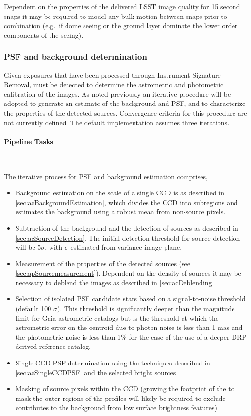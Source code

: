 Dependent on the properties of the delivered LSST image quality for 15 second snaps it may be required to model any bulk motion between snaps prior to combination (e.g.\ if dome seeing or the ground layer dominate the lower order components of the seeing).

\subsubsection{PSF and background determination}
\label{sec:apPSFBackground}

Given exposures that have been processed through Instrument Signature Removal, \Sources must be detected to determine the astrometric and photometric calibration of the images. As noted previously an iterative procedure will be adopted to generate an estimate of the background and PSF, and to characterize the properties of the detected sources.  Convergence criteria for this procedure are not currently defined. The default implementation assumes three iterations.

\paragraph{Pipeline Tasks}~

The iterative process for PSF and background estimation comprises,
\begin{itemize}
\item Background estimation on the scale of a single CCD is as described in \ref{sec:acBackgroundEstimation}, which divides the CCD into subregions and estimates the background using a robust mean from non-source pixels.
\item Subtraction of the background and the detection of sources as described in \ref{sec:acSourceDetection}. The initial detection threshold for source detection will be 5$\sigma$, with $\sigma$ estimated from variance image plane.
\item Measurement of the properties of the detected sources (see \ref{sec:apSourcemeasurement}). Dependent on the density of sources it may be necessary to deblend the images as described in \ref{sec:acDeblending}
\item Selection of isolated PSF candidate stars based on a signal-to-noise threshold (default 100 $\sigma$). This threshold is significantly deeper than the magnitude limit for Gaia astrometric catalogs but is the threshold at which the astrometric error on the centroid due to photon noise is less than 1 mas and the photometric noise is less than 1\% for the case of the use of a deeper DRP derived reference catalog.
\item Single CCD PSF determination using the techniques described in \ref{sec:acSingleCCDPSF} and the selected bright sources 
\item Masking of source pixels within the CCD (growing the footprint of the \Sources to mask the outer regions of the \Source profiles will likely be required to exclude contributes to the background from low surface brightness features).
\end{itemize}

